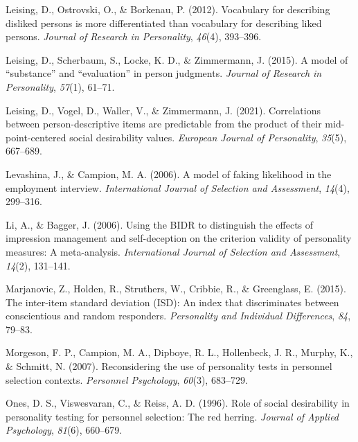 \documentclass[
  ,jou]{apa6}
\newlength{\cslhangindent}
\newlength{\cslentryspacingunit} %
\newenvironment{CSLReferences}[2] %
 {%
  \setlength{\parindent}{0pt}
  \ifodd #1
  \let\oldpar\par
  \def\par{\hangindent=\cslhangindent\oldpar}
  \fi
  \setlength{\parskip}{#2\cslentryspacingunit}
 }%
 {}
\begin{document}
\begin{CSLReferences}{1}{0}
\leavevmode{}%
Leising, D., Ostrovski, O., \& Borkenau, P. (2012). Vocabulary for describing disliked persons is more differentiated than vocabulary for describing liked persons. \emph{Journal of Research in Personality}, \emph{46}(4), 393--396.

\leavevmode{}%
Leising, D., Scherbaum, S., Locke, K. D., \& Zimmermann, J. (2015). A model of {``substance''} and {``evaluation''} in person judgments. \emph{Journal of Research in Personality}, \emph{57}(1), 61--71.

\leavevmode{}%
Leising, D., Vogel, D., Waller, V., \& Zimmermann, J. (2021). Correlations between person-descriptive items are predictable from the product of their mid-point-centered social desirability values. \emph{European Journal of Personality}, \emph{35}(5), 667--689.

\leavevmode{}%
Levashina, J., \& Campion, M. A. (2006). A model of faking likelihood in the employment interview. \emph{International Journal of Selection and Assessment}, \emph{14}(4), 299--316.

\leavevmode{}%
Li, A., \& Bagger, J. (2006). Using the {BIDR} to distinguish the effects of impression management and self-deception on the criterion validity of personality measures: A meta-analysis. \emph{International Journal of Selection and Assessment}, \emph{14}(2), 131--141.

\leavevmode{}%
Marjanovic, Z., Holden, R., Struthers, W., Cribbie, R., \& Greenglass, E. (2015). The inter-item standard deviation ({ISD}): An index that discriminates between conscientious and random responders. \emph{Personality and Individual Differences}, \emph{84}, 79--83.

\leavevmode{}%
Morgeson, F. P., Campion, M. A., Dipboye, R. L., Hollenbeck, J. R., Murphy, K., \& Schmitt, N. (2007). Reconsidering the use of personality tests in personnel selection contexts. \emph{Personnel Psychology}, \emph{60}(3), 683--729.

\leavevmode{}%
Ones, D. S., Viswesvaran, C., \& Reiss, A. D. (1996). Role of social desirability in personality testing for personnel selection: The red herring. \emph{Journal of Applied Psychology}, \emph{81}(6), 660--679.


\end{CSLReferences}
\end{document}

